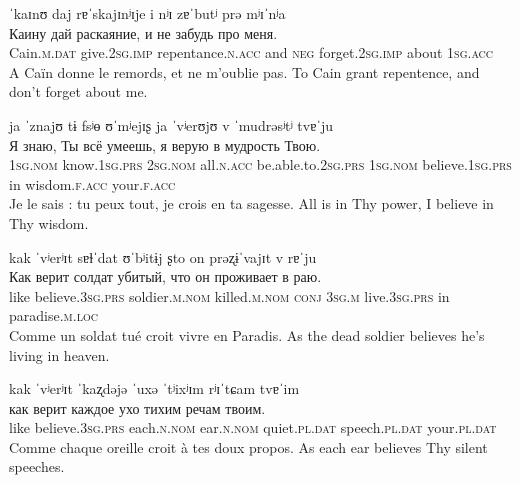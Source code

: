 \documentclass[12pt]{article}
\begin{document}
\begin{exe}
    \glll
    ˈkaɪnʊ daj rɐˈskajɪnʲɪje i nʲɪ zɐˈbutʲ prə mʲɪˈnʲa\\
    Каину дай раскаяние, и не забудь про меня.\\
    Cain.\textsc{m.dat} give.2\textsc{sg.imp} repentance.\textsc{n.acc} and \textsc{neg} forget.2\textsc{sg.imp} about 1\textsc{sg.acc}\\
    \trans
    A Caïn donne le remords, et ne m'oublie pas.
    \trans
    To Cain grant repentence, and don't forget about me.
\end{exe}

\dotfill

\begin{exe}
    \glll
    ja ˈznajʊ tɨ fsʲɵ ʊˈmʲejɪʂ ja ˈvʲerʊjʊ v ˈmudrəsʲtʲ tvɐˈju\\
    Я знаю, Ты всё умеешь, я верую в мудрость Твою.\\
    1\textsc{sg.nom} know.1\textsc{sg.prs} 2\textsc{sg.nom} all.\textsc{n.acc} be.able.to.2\textsc{sg.prs} 1\textsc{sg.nom} believe.1\textsc{sg.prs} in wisdom.\textsc{f.acc} your.\textsc{f.acc}\\
    \trans
    Je le sais : tu peux tout, je crois en ta sagesse.
    \trans
    All is in Thy power, I believe in Thy wisdom.
\end{exe}

\begin{exe}
    \glll
    kak ˈvʲerʲɪt sɐɫˈdat ʊˈbʲitɨj ʂto on prəʐɨˈvajɪt v rɐˈju\\
    Как верит солдат убитый, что он проживает в раю.\\
    like believe.3\textsc{sg.prs} soldier.\textsc{m.nom} killed.\textsc{m.nom} \textsc{conj} 3\textsc{sg.m} live.3\textsc{sg.prs} in paradise.\textsc{m.loc}\\
    \trans
    Comme un soldat tué croit vivre en Paradis.
    \trans
    As the dead soldier believes he's living in heaven.
\end{exe}

\begin{exe}
    \glll
    kak ˈvʲerʲɪt ˈkaʐdəjə ˈuxə ˈtʲixʲɪm rʲɪˈtɕam tvɐˈim\\
    как верит каждое ухо тихим речам твоим.\\
    like believe.3\textsc{sg.prs} each.\textsc{n.nom} ear.\textsc{n.nom} quiet.\textsc{pl.dat} speech.\textsc{pl.dat} your.\textsc{pl.dat}\\
    \trans
    Comme chaque oreille croit à tes doux propos.
    \trans
    As each ear believes Thy silent speeches.
\end{exe}
\end{document}
